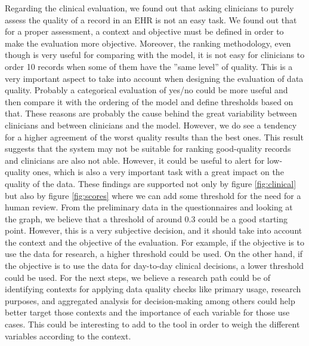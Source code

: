 Regarding the clinical evaluation, we found out that asking clinicians to purely assess the quality of a record in an EHR is not an easy task. We found out that for a proper assessment, a context and objective must be defined in order to make the evaluation more objective. Moreover, the ranking methodology, even though is very useful for comparing with the model, it is not easy for clinicians to order 10 records when some of them have the ”same level” of quality. This is a very important aspect to take into account when designing the evaluation of data quality. Probably a categorical evaluation of yes/no could be more useful and then compare it with the ordering of the model and define thresholds based on that. These reasons are probably the cause behind the great variability between clinicians and between clinicians and the model. However, we do see a tendency for a higher agreement of the worst quality results than the best ones. This result suggests that the system may not be suitable for ranking good-quality records and clinicians are also not able. However, it could be useful to alert for low-quality ones, which is also a very important task with a great impact on the quality of the data. These findings are supported not only by figure \ref{fig:clinical} but also by figure \ref{fig:scores} where we can add some threshold for the need for a human review. From the preliminary data in the questionnaires and looking at the graph, we believe that a threshold of around 0.3 could be a good starting point. However, this is a very subjective decision, and it should take into account the context and the objective of the evaluation. For example, if the objective is to use the data for research, a higher threshold could be used. On the other hand, if the objective is to use the data for day-to-day clinical decisions, a lower threshold could be used.
For the next steps, we believe a research path could be of identifying contexts for applying data quality checks like primary usage, research purposes, and aggregated analysis for decision-making among others could help better target those contexts and the importance of each variable for those use cases. This could be interesting to add to the tool in order to weigh the different variables according to the context.


